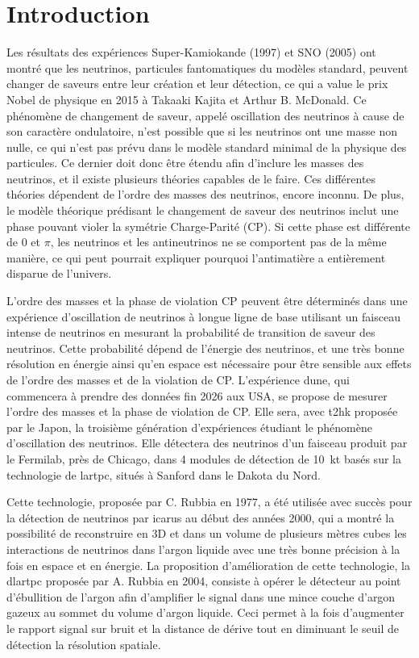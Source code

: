 \chapter{Introduction}

Les résultats des expériences Super-Kamiokande (1997) et SNO (2005) ont montré que les neutrinos, particules fantomatiques du modèles standard, peuvent changer de saveurs entre leur création et leur détection, ce qui a value le prix Nobel de physique en 2015 à Takaaki Kajita et Arthur B. McDonald.  Ce phénomène de changement de saveur, appelé oscillation des neutrinos à cause de son caractère ondulatoire, n'est possible que si les neutrinos ont une masse non nulle, ce qui n'est pas prévu dans le modèle standard minimal de la physique des particules. Ce dernier doit donc être étendu afin d'inclure les masses des neutrinos, et il existe plusieurs théories capables de le faire. Ces différentes théories dépendent de l'ordre des masses des neutrinos, encore inconnu. De plus, le modèle théorique prédisant le changement de saveur des neutrinos inclut une phase pouvant violer la symétrie Charge-Parité (CP). Si cette phase est différente de 0 et $\pi$, les neutrinos et les antineutrinos ne se comportent pas de la même manière, ce qui peut pourrait expliquer pourquoi l'antimatière a entièrement disparue de l'univers. 

L'ordre des masses et la phase de violation CP peuvent être déterminés dans une expérience d'oscillation de neutrinos à longue ligne de base utilisant un faisceau intense de neutrinos en mesurant la probabilité de transition de saveur des neutrinos. Cette probabilité dépend de l'énergie des neutrinos, et une très bonne résolution en énergie ainsi qu'en espace est nécessaire pour être sensible aux effets de l'ordre des masses et de la violation de CP. L'expérience \gls{dune}, qui commencera à prendre des données fin 2026 aux USA, se propose de mesurer l'ordre des masses et la phase de violation de CP. Elle sera, avec \acrshort{t2hk} proposée par le Japon, la troisième génération d'expériences étudiant le phénomène d'oscillation des neutrinos. Elle détectera des neutrinos d'un faisceau produit par le Fermilab, près de Chicago, dans 4 modules de détection de \SI{10}{\kilo\tonne} basés sur la technologie de \gls{lartpc}, situés à Sanford dans le Dakota du Nord.

Cette technologie, proposée par C. Rubbia en 1977, a été utilisée avec succès pour la détection de neutrinos par \acrshort{icarus} au début des années 2000, qui a montré la possibilité de reconstruire en 3D et dans un volume de plusieurs mètres cubes les interactions de neutrinos dans l'argon liquide avec une très bonne précision à la fois en espace et en énergie. La proposition d'amélioration de cette technologie, la \gls{dlartpc} proposée par A. Rubbia en 2004, consiste à opérer le détecteur au point d'ébullition de l'argon afin d'amplifier le signal dans une mince couche d'argon gazeux au sommet du volume d'argon liquide. Ceci permet à la fois d'augmenter le rapport signal sur bruit et la distance de dérive tout en diminuant le seuil de détection la résolution spatiale. 

